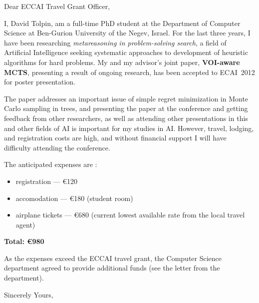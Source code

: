 \documentclass[11pt]{letter}
\begin{document}
\begin{letter}{}
\opening{Dear ECCAI Travel Grant Officer,}

I, David Tolpin, am a full-time PhD student at the Department of
Computer Science at Ben-Gurion University of the Negev, Israel. For the last
three years, I have been researching {\it metareasoning in
  problem-solving search}, a field of Artificial Intelligence seeking
systematic approaches to development of heuristic algorithms for hard
problems. My and my advisor's joint paper, {\bf VOI-aware MCTS},
presenting a result of ongoing research, has been accepted to
ECAI~2012 for poster presentation.

The paper addresses an important issue of simple regret minimization
in Monte Carlo sampling in trees, and presenting the paper at the
conference and getting feedback from other researchers,
as well as attending other presentations in this and other fields of
AI is important for my studies in AI. However, travel,
lodging, and registration costs are high, and without financial 
support I will have difficulty attending the conference.

The anticipated expenses are :

\begin{itemize}
\item registration --- \euro{120}
\item accomodation --- \euro{180} (student room)
\item airplane tickets --- \euro{680} (current lowest available rate
  from the local travel agent)
\end{itemize}

{\bf Total: \euro{980}}

As the expenses exceed the ECCAI travel grant, the Computer Science
department agreed to provide additional funds (see the letter from the 
department).

\closing{Sincerely Yours,}

\end{letter}
\end{document}
